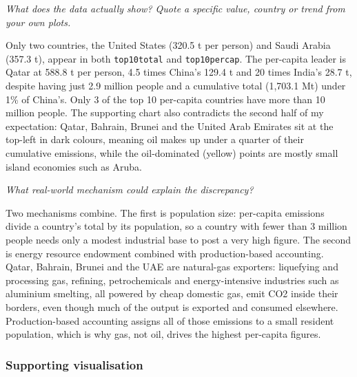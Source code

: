 \documentclass[
]{article}
\begin{document}
\emph{What does the data actually show? Quote a specific value, country
or trend from your own plots.}

Only two countries, the United States (320.5 t per person) and Saudi
Arabia (357.3 t), appear in both \texttt{top10total} and
\texttt{top10percap}. The per-capita leader is Qatar at 588.8 t per
person, 4.5 times China's 129.4 t and 20 times India's 28.7 t, despite
having just 2.9 million people and a cumulative total (1,703.1 Mt) under
1\% of China's. Only 3 of the top 10 per-capita countries have more than
10 million people. The supporting chart also contradicts the second half
of my expectation: Qatar, Bahrain, Brunei and the United Arab Emirates
sit at the top-left in dark colours, meaning oil makes up under a
quarter of their cumulative emissions, while the oil-dominated (yellow)
points are mostly small island economies such as Aruba.

\emph{What real-world mechanism could explain the discrepancy?}

Two mechanisms combine. The first is population size: per-capita
emissions divide a country's total by its population, so a country with
fewer than 3 million people needs only a modest industrial base to post
a very high figure. The second is energy resource endowment combined
with production-based accounting. Qatar, Bahrain, Brunei and the UAE are
natural-gas exporters: liquefying and processing gas, refining,
petrochemicals and energy-intensive industries such as aluminium
smelting, all powered by cheap domestic gas, emit CO2 inside their
borders, even though much of the output is exported and consumed
elsewhere. Production-based accounting assigns all of those emissions to
a small resident population, which is why gas, not oil, drives the
highest per-capita figures.

\subsubsection{Supporting visualisation}\label{supporting-visualisation}
\end{document}
